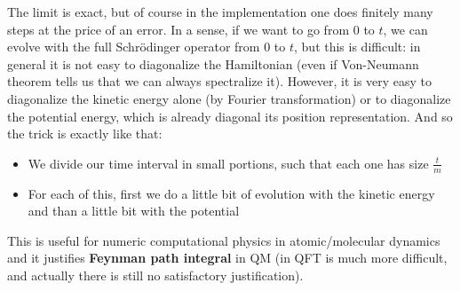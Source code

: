 \documentclass[../main.tex]{subfiles}
\begin{document}
The limit is exact, but of course in the implementation one does finitely many steps at the price of an error. In a sense, if we want to go from $0$ to $t$, we can evolve with the full Schr\"odinger operator from $0$ to $t$, but this is difficult: in general it is not easy to diagonalize the Hamiltonian (even if Von-Neumann theorem tells us that we can always spectralize it). However, it is very easy to diagonalize the kinetic energy alone (by Fourier transformation) or to diagonalize the potential energy, which is already diagonal its position representation. And so the trick is exactly like that:
\begin{itemize}
    \item We divide our time interval in small portions, such that each one has size $\frac{t}{m}$
    \item For each of this, first we do a little bit of evolution with the kinetic energy and than a little bit with the potential
\end{itemize}
This is useful for numeric computational physics in atomic/molecular dynamics and it justifies \textbf{Feynman path integral} in QM (in QFT is much more difficult, and actually there is still no satisfactory justification).
\end{document}
